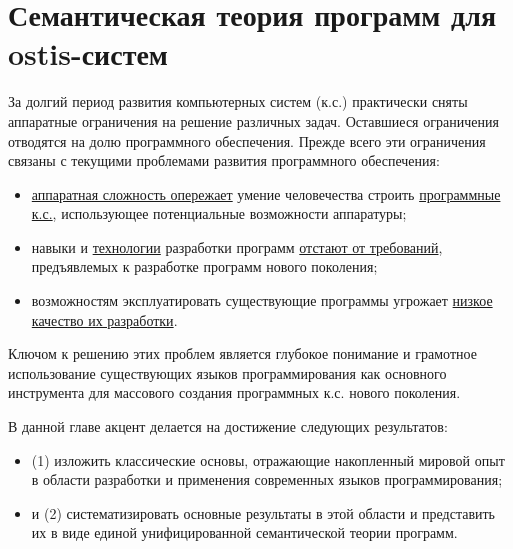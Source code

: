 \chapter{Семантическая теория программ для ostis-систем}
\label{chapter_programs}



За долгий период развития компьютерных систем (к.с.) практически сняты аппаратные ограничения на решение различных задач. Оставшиеся ограничения отводятся на долю программного обеспечения. Прежде всего эти ограничения связаны с текущими проблемами развития программного обеспечения:
\begin{itemize}
    \item \underline{аппаратная сложность опережает} умение человечества строить \underline{программные к.с.}, использующее потенциальные возможности аппаратуры;
    \item навыки и \underline{технологии} разработки программ \underline{отстают от требований}, предъявлемых к разработке программ нового поколения;
    \item возможностям эксплуатировать существующие программы угрожает \underline{низкое качество их разработки}.
\end{itemize}

Ключом к решению этих проблем является глубокое понимание и грамотное использование существующих языков программирования как основного инструмента для массового создания программных к.с. нового поколения.

В данной главе акцент делается на достижение следующих результатов:
\begin{itemize}
    \item (1) изложить классические основы, отражающие накопленный мировой опыт в области разработки и применения современных языков программирования;
    \item и (2) систематизировать основные результаты в этой области и представить их в виде единой унифицированной семантической теории программ.
\end{itemize}

